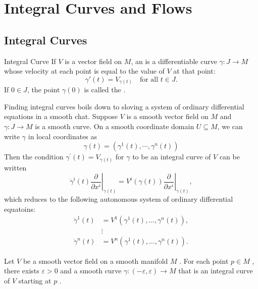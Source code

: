 \documentclass[../main.tex]{subfiles}
\begin{document}
\ifSubfilesClassLoaded{

    \tableofcontents
    
}{}

\chapter{ Integral Curves and Flows }

\section{Integral Curves}


\begin{definition}{Integral Curve}{}
    If $V$ is a vector field on $M$, an  is a differentiable curve $\gamma: J \to M$ whose velocity at each point is equal to the value of $V$ at that point:
$$\gamma'(t) = V_{\gamma(t)} \quad \text{for all } t \in J.$$
If $0 \in J$, the point $\gamma(0)$ is called the . 
\end{definition}

Finding integral curves boils down to sloving a system of ordinary differential equations in a smooth chat. Suppose \(  V  \) is a smooth vector field on \(  M  \) and \(   \gamma :J\to M  \) is a smooth curve. On a smooth coordinate domain \(  U\subseteq M  \), we can write \(   \gamma   \) in local coordinates as  \[
 \gamma \left( t \right)= \left(  \gamma ^{1}\left( t \right),\cdots , \gamma ^{n}\left( t \right)   \right)  
\]     Then the condition \(   \gamma ^{\prime} \left( t \right)= V_{ \gamma \left( t \right) }   \) for \(   \gamma   \) to be an integral curve of \(  V  \) can be written \[
 \dot{\gamma}^{i}\left( t \right) \left. \frac{\partial }{\partial x^{i}} \right|_{ \gamma \left( t \right) }=   V^{i}\left(  \gamma \left( t \right)  \right)\left. \frac{\partial }{\partial x^{i}} \right|_{ \gamma \left( t \right) } , 
\]  which reduces to the following autonomous system of ordinary differential equatoins:  
\[
\begin{aligned}
\dot{\gamma}^1(t) &= V^1(\gamma^1(t), \dots, \gamma^n(t)), \\
&\vdots \\
\dot{\gamma}^n(t) &= V^n(\gamma^1(t), \dots, \gamma^n(t)).
\end{aligned}
\]

\begin{proposition}{}{}
    Let \(  V  \) be a smooth vector field on a smooth manifold \(  M  \) . For each point \(  p \in M  \) , there exists \(   \varepsilon > 0  \) and a smooth curve \(   \gamma : \left( - \varepsilon , \varepsilon  \right)\to M   \) that is an integral curve of \(  V  \) starting at \(  p  \) .        
\end{proposition}
\end{document}
